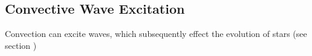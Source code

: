 {\color{purple}
\subsection{Convective Wave Excitation}
}

Convection can excite waves, which subsequently effect the evolution of stars (see section )
